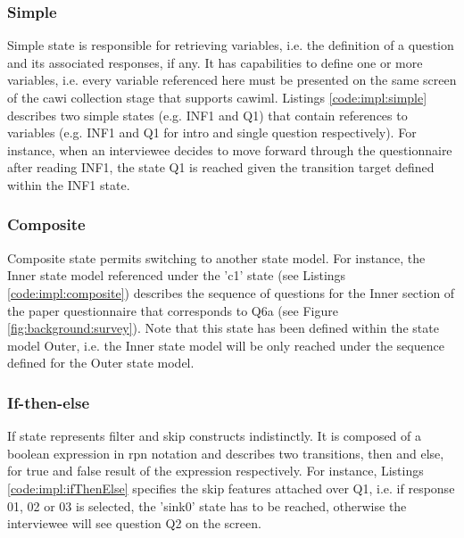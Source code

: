 	\subsubsection{Simple}
		Simple state is responsible for retrieving variables, i.e. the definition of a question and its associated responses, if any. It has capabilities to define one or more variables, i.e. every variable referenced here must be presented on the same screen of the \gls{cawi} collection stage that supports \gls{cawiml}. Listings \ref{code:impl:simple} describes two simple states (e.g. INF1 and Q1) that contain references to variables (e.g. INF1 and Q1 for intro and single question respectively). For instance, when an interviewee decides to move forward through the questionnaire after reading INF1, the state Q1 is reached given the transition target defined within the INF1 state.
		
	\subsubsection{Composite}
		Composite state permits switching to another state model. For instance, the Inner state model referenced under the 'c1' state (see Listings \ref{code:impl:composite}) describes the sequence of questions for the Inner section of the paper questionnaire that corresponds to Q6a (see Figure \ref{fig:background:survey}). Note that this state has been defined within the state model Outer, i.e. the Inner state model will be only reached under the sequence defined for the Outer state model.
		
	\subsubsection{If-then-else}
		If state represents filter and skip constructs indistinctly. It is composed of a boolean expression in \gls{rpn} notation and describes two transitions, then and else, for true and false result of the expression respectively. For instance, Listings \ref{code:impl:ifThenElse} specifies the skip features attached over Q1, i.e. if response 01, 02 or 03 is selected, the 'sink0' state has to be reached, otherwise the interviewee will see question Q2 on the screen.
		

